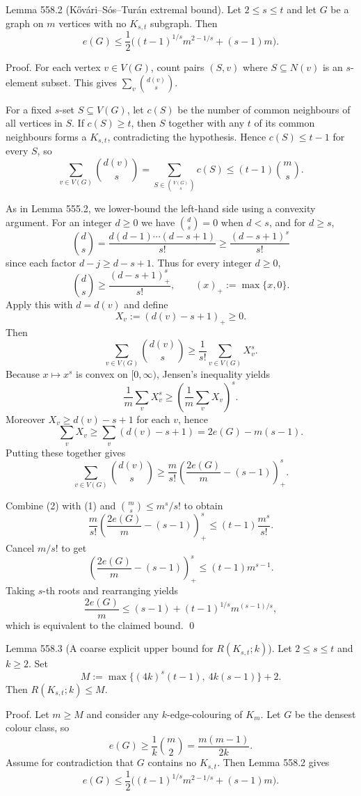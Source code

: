 Lemma 558.2 (K\H{o}v\'ari--S\'os--Tur\'an extremal bound).
Let $2\le s\le t$ and let $G$ be a graph on $m$ vertices with no $K_{s,t}$ subgraph.
Then
\[
e(G)\le \frac12\Big((t-1)^{1/s}m^{2-1/s}+(s-1)m\Big).
\]

Proof.
For each vertex $v\in V(G)$, count pairs $(S,v)$ where $S\subseteq N(v)$ is an $s$-element subset.
This gives $\sum_v \binom{d(v)}{s}$.

For a fixed $s$-set $S\subseteq V(G)$, let $c(S)$ be the number of common neighbours of all vertices in $S$.
If $c(S)\ge t$, then $S$ together with any $t$ of its common neighbours forms a $K_{s,t}$, contradicting the hypothesis.
Hence $c(S)\le t-1$ for every $S$, so
\[
\sum_{v\in V(G)} \binom{d(v)}{s}=
\sum_{S\in \binom{V(G)}{s}} c(S)
\le (t-1)\binom{m}{s}.
\tag{1}
\]

As in Lemma 555.2, we lower-bound the left-hand side using a convexity argument.
For an integer $d\ge 0$ we have $\binom{d}{s}=0$ when $d<s$, and for $d\ge s$,
\[
\binom{d}{s}=\frac{d(d-1)\cdots(d-s+1)}{s!}\ge \frac{(d-s+1)^s}{s!}
\]
since each factor $d-j\ge d-s+1$.
Thus for every integer $d\ge 0$,
\[
\binom{d}{s}\ge \frac{(d-s+1)_+^s}{s!},\qquad (x)_+:=\max\{x,0\}.
\]
Apply this with $d=d(v)$ and define
\[
X_v:=(d(v)-s+1)_+\ge 0.
\]
Then
\[
\sum_{v\in V(G)}\binom{d(v)}{s}\ge \frac{1}{s!}\sum_{v\in V(G)} X_v^s.
\]
Because $x\mapsto x^s$ is convex on $[0,\infty)$, Jensen's inequality yields
\[
\frac{1}{m}\sum_v X_v^s\ge \left(\frac{1}{m}\sum_v X_v\right)^s.
\]
Moreover $X_v\ge d(v)-s+1$ for each $v$, hence
\[
\sum_v X_v\ge \sum_v (d(v)-s+1)=2e(G)-m(s-1).
\]
Putting these together gives
\[
\sum_{v\in V(G)} \binom{d(v)}{s}
\ge \frac{m}{s!}\left(\frac{2e(G)}{m}-(s-1)\right)_+^s.
\tag{2}
\]

Combine (2) with (1) and $\binom{m}{s}\le m^s/s!$ to obtain
\[
\frac{m}{s!}\left(\frac{2e(G)}{m}-(s-1)\right)_+^s\le (t-1)\frac{m^s}{s!}.
\]
Cancel $m/s!$ to get
\[
\left(\frac{2e(G)}{m}-(s-1)\right)_+^s\le (t-1)m^{s-1}.
\]
Taking $s$-th roots and rearranging yields
\[
\frac{2e(G)}{m}\le (s-1)+(t-1)^{1/s}m^{(s-1)/s},
\]
which is equivalent to the claimed bound.
\qed

Lemma 558.3 (A coarse explicit upper bound for $R(K_{s,t};k)$).
Let $2\le s\le t$ and $k\ge 2$.
Set
\[
M:=\max\{(4k)^s(t-1),\ 4k(s-1)\}+2.
\]
Then $R(K_{s,t};k)\le M$.

Proof.
Let $m\ge M$ and consider any $k$-edge-colouring of $K_m$.
Let $G$ be the densest colour class, so
\[
e(G)\ge \frac{1}{k}\binom{m}{2}=\frac{m(m-1)}{2k}.
\tag{3}
\]
Assume for contradiction that $G$ contains no $K_{s,t}$.
Then Lemma 558.2 gives
\[
e(G)\le \frac12\Big((t-1)^{1/s}m^{2-1/s}+(s-1)m\Big).
\tag{4}
\]

